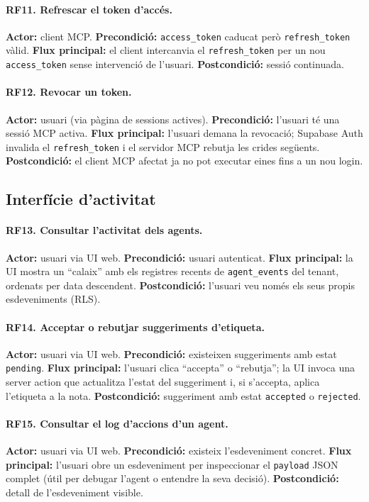 \paragraph{RF11. Refrescar el token d'accés.}
\textbf{Actor:} client MCP.
\textbf{Precondició:} \texttt{access\_token} caducat però
\texttt{refresh\_token} vàlid.
\textbf{Flux principal:} el client intercanvia el \texttt{refresh\_token}
per un nou \texttt{access\_token} sense intervenció de l'usuari.
\textbf{Postcondició:} sessió continuada.

\paragraph{RF12. Revocar un token.}
\textbf{Actor:} usuari (via pàgina de sessions actives).
\textbf{Precondició:} l'usuari té una sessió MCP activa.
\textbf{Flux principal:} l'usuari demana la revocació; Supabase Auth
invalida el \texttt{refresh\_token} i el servidor MCP rebutja les
crides següents.
\textbf{Postcondició:} el client MCP afectat ja no pot executar eines
fins a un nou login.

\subsection{Interfície d'activitat}

\paragraph{RF13. Consultar l'activitat dels agents.}
\textbf{Actor:} usuari via UI web.
\textbf{Precondició:} usuari autenticat.
\textbf{Flux principal:} la UI mostra un ``calaix'' amb els registres
recents de \texttt{agent\_events} del tenant, ordenats per data
descendent.
\textbf{Postcondició:} l'usuari veu només els seus propis esdeveniments
(RLS).

\paragraph{RF14. Acceptar o rebutjar suggeriments d'etiqueta.}
\textbf{Actor:} usuari via UI web.
\textbf{Precondició:} existeixen suggeriments amb estat
\texttt{pending}.
\textbf{Flux principal:} l'usuari clica ``accepta'' o ``rebutja'';
la UI invoca una server action que actualitza l'estat del suggeriment i,
si s'accepta, aplica l'etiqueta a la nota.
\textbf{Postcondició:} suggeriment amb estat \texttt{accepted} o
\texttt{rejected}.

\paragraph{RF15. Consultar el log d'accions d'un agent.}
\textbf{Actor:} usuari via UI web.
\textbf{Precondició:} existeix l'esdeveniment concret.
\textbf{Flux principal:} l'usuari obre un esdeveniment per inspeccionar
el \texttt{payload} JSON complet (útil per debugar l'agent o entendre la
seva decisió).
\textbf{Postcondició:} detall de l'esdeveniment visible.

